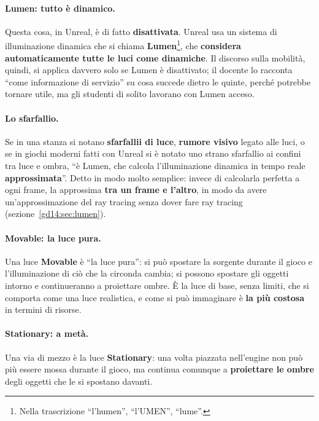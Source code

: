 \paragraph{Lumen: tutto è dinamico.} Questa cosa, in Unreal, è di fatto
\textbf{disattivata}. Unreal usa un sistema di illuminazione dinamica che si chiama
\textbf{Lumen}\footnote{Nella trascrizione ``l'humen'', ``l'UMEN'', ``lume''.}, che
\textbf{considera automaticamente tutte le luci come dinamiche}. Il discorso sulla
mobilità, quindi, si applica davvero solo se Lumen è disattivato; il docente lo
racconta ``come informazione di servizio'' su cosa succede dietro le quinte,
perché potrebbe tornare utile, ma gli studenti di solito lavorano con Lumen
acceso.

\paragraph{Lo sfarfallio.} Se in una stanza si notano \textbf{sfarfallii di luce},
\textbf{rumore visivo} legato alle luci, o se in giochi moderni fatti con Unreal si
è notato uno strano sfarfallio ai confini tra luce e ombra, ``è Lumen, che calcola
l'illuminazione dinamica in tempo reale \textbf{approssimata}''. Detto in modo molto
semplice: invece di calcolarla perfetta a ogni frame, la approssima \textbf{tra un
frame e l'altro}, in modo da avere un'approssimazione del ray tracing senza dover
fare ray tracing (sezione~\ref{gd14:sec:lumen}).

\paragraph{Movable: la luce pura.} Una luce \textbf{Movable} è ``la luce pura'': si
può spostare la sorgente durante il gioco e l'illuminazione di ciò che la circonda
cambia; si possono spostare gli oggetti intorno e continueranno a proiettare ombre.
È la luce di base, senza limiti, che si comporta come una luce realistica, e come
si può immaginare è \textbf{la più costosa} in termini di risorse.

\paragraph{Stationary: a metà.} Una via di mezzo è la luce \textbf{Stationary}: una
volta piazzata nell'engine non può più essere mossa durante il gioco, ma continua
comunque a \textbf{proiettare le ombre} degli oggetti che le si spostano davanti.

